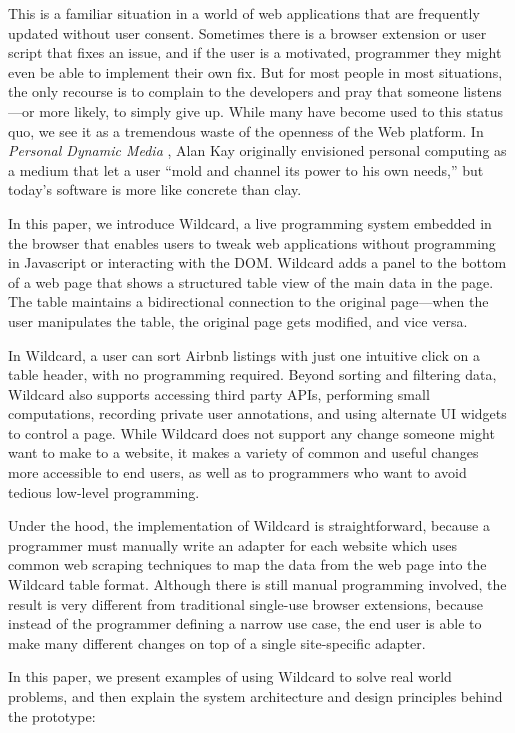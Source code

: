 \documentclass[english,submission]{programming}
\begin{document}
This is a familiar situation in a world of web applications that are
frequently updated without user consent. Sometimes there is a browser
extension or user script that fixes an issue, and if the user is a
motivated, programmer they might even be able to implement their own
fix. But for most people in most situations, the only recourse is to
complain to the developers and pray that someone listens---or more
likely, to simply give up. While many have become used to this status
quo, we see it as a tremendous waste of the openness of the Web
platform. In \emph{Personal Dynamic Media} \autocite{kay1977}, Alan Kay
originally envisioned personal computing as a medium that let a user
``mold and channel its power to his own needs,'' but today's software is
more like concrete than clay.

In this paper, we introduce Wildcard, a live programming system embedded
in the browser that enables users to tweak web applications without
programming in Javascript or interacting with the DOM. Wildcard adds a
panel to the bottom of a web page that shows a structured table view of
the main data in the page. The table maintains a bidirectional
connection to the original page---when the user manipulates the table,
the original page gets modified, and vice versa.

In Wildcard, a user can sort Airbnb listings with just one intuitive
click on a table header, with no programming required. Beyond sorting
and filtering data, Wildcard also supports accessing third party APIs,
performing small computations, recording private user annotations, and
using alternate UI widgets to control a page. While Wildcard does not
support any change someone might want to make to a website, it makes a
variety of common and useful changes more accessible to end users, as
well as to programmers who want to avoid tedious low-level programming.

Under the hood, the implementation of Wildcard is straightforward,
because a programmer must manually write an adapter for each website
which uses common web scraping techniques to map the data from the web
page into the Wildcard table format. Although there is still manual
programming involved, the result is very different from traditional
single-use browser extensions, because instead of the programmer
defining a narrow use case, the end user is able to make many different
changes on top of a single site-specific adapter.

In this paper, we present examples of using Wildcard to solve real world
problems, and then explain the system architecture and design principles
behind the prototype:
\end{document}
